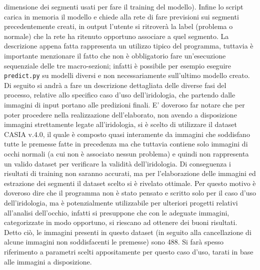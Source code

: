 dimensione dei segmenti usati per fare il training del modello). Infine lo script carica in memoria il modello e chiede alla rete di fare previsioni sui segmenti precedentemente creati, in output l’utente si ritroverà la label (problema o normale) che la rete ha ritenuto opportuno associare a quel segmento. La descrizione appena fatta rappresenta un utilizzo tipico del programma, tuttavia è importante menzionare il fatto che non è obbligatorio fare un’esecuzione sequenziale delle tre macro-sezioni; infatti è possibile per esempio eseguire \texttt{predict.py} su modelli diversi e non necessariamente sull’ultimo modello creato. Di seguito si andrà a fare un descrizione dettagliata delle diverse fasi del processo, relative allo specifico caso d’uso dell’iridologia,  che partendo dalle immagini di input portano alle predizioni finali. E’ doveroso far notare che per poter procedere nella realizzazione dell’elaborato, non avendo a disposizione immagini strettamente legate all’iridologia, si è scelto di utilizzare il dataset CASIA v.4.0, il quale è composto quasi interamente da immagini che soddisfano tutte le premesse fatte in precedenza ma che tuttavia contiene solo immagini di occhi normali (a cui non è associato nessun problema) e quindi non rappresenta un valido dataset per verificare la validità dell’iridologia. Di conseguenza i risultati di training non saranno accurati, ma per l’elaborazione delle immagini ed estrazione dei segmenti il dataset scelto si è rivelato ottimale. Per questo motivo è doveroso dire che il programma non è stato pensato e scritto solo per il caso d’uso dell’iridologia, ma è potenzialmente utilizzabile per ulteriori progetti relativi all’analisi dell’occhio, infatti si presuppone che con le adeguate immagini, categorizzate in modo opportuno, si riescano ad ottenere dei buoni risultati. Detto ciò, le immagini presenti in questo dataset (in seguito alla cancellazione di alcune immagini non soddisfacenti le premesse) sono 488. Si farà spesso riferimento a parametri scelti appositamente per questo caso d’uso, tarati in base alle immagini a disposizione.
